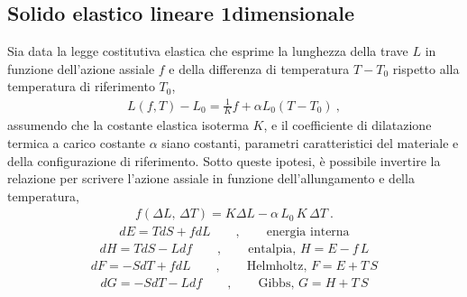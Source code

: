\documentclass[letterpaper,10pt,italian]{jupyterBook}
\begin{document}
\subsection{Solido elastico lineare 1\sphinxhyphen{}dimensionale}
\label{\detokenize{ch/thermodynamics/elastic-solid-1d:solido-elastico-lineare-1-dimensionale}}
\sphinxAtStartPar
{}
Sia data la legge costitutiva elastica che esprime la lunghezza della trave \(L\) in funzione dell’azione assiale \(f\) e della differenza di temperatura \(T-T_0\) rispetto alla temperatura di riferimento \(T_0\),
\begin{equation*}
\begin{split}L(f,T) - L_0 = \frac{1}{K} f + \alpha L_0 (T-T_0) \ ,\end{split}
\end{equation*}
\sphinxAtStartPar
assumendo che la costante elastica isoterma \(K\), e il coefficiente di dilatazione termica a carico costante \(\alpha\) siano costanti, parametri caratteristici del materiale e della configurazione di riferimento. Sotto queste ipotesi, è possibile invertire la relazione per scrivere l’azione assiale in funzione dell’allungamento e della temperatura,
\begin{equation*}
\begin{split}f(\Delta L, \, \Delta T) = K \Delta L - \alpha \, L_0 \, K \, \Delta T \ .\end{split}
\end{equation*}
\sphinxAtStartPar
{}
\begin{equation*}
\begin{split}dE = T dS + f dL  \qquad , \qquad \text{energia interna} \end{split}
\end{equation*}\begin{equation*}
\begin{split}dH = T dS - L df  \qquad , \qquad \text{entalpia, $H = E - f \, L$} \end{split}
\end{equation*}\begin{equation*}
\begin{split}dF =-S dT + f dL  \qquad , \qquad \text{Helmholtz, $F = E + T \, S$} \end{split}
\end{equation*}\begin{equation*}
\begin{split}dG =-S dT - L df  \qquad , \qquad \text{Gibbs, $G = H + T \, S$} \end{split}
\end{equation*}
\end{document}
